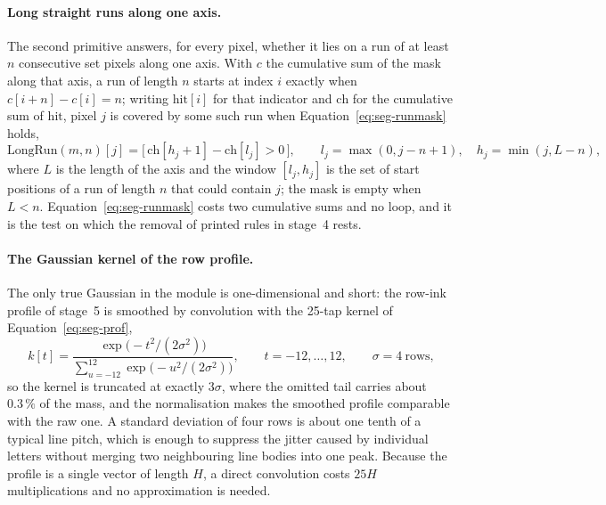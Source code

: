 \paragraph{Long straight runs along one axis.}
The second primitive answers, for every pixel, whether it lies on a run of at least $n$ consecutive set pixels along one axis.
With $c$ the cumulative sum of the mask along that axis, a run of length $n$ starts at index $i$ exactly when $c[i+n]-c[i]=n$; writing $\mathrm{hit}[i]$ for that indicator and $\mathrm{ch}$ for the cumulative sum of $\mathrm{hit}$, pixel $j$ is covered by some such run when Equation~\ref{eq:seg-runmask} holds,
\begin{equation}
\mathrm{LongRun}(m,n)[j]=\bigl[\,\mathrm{ch}[h_j+1]-\mathrm{ch}[l_j]>0\,\bigr],\qquad l_j=\max(0,j-n+1),\quad h_j=\min(j,L-n),
\label{eq:seg-runmask}
\end{equation}
where $L$ is the length of the axis and the window $[l_j,h_j]$ is the set of start positions of a run of length $n$ that could contain $j$; the mask is empty when $L<n$.
Equation~\ref{eq:seg-runmask} costs two cumulative sums and no loop, and it is the test on which the removal of printed rules in stage~4 rests.

\paragraph{The Gaussian kernel of the row profile.}
The only true Gaussian in the module is one-dimensional and short: the row-ink profile of stage~5 is smoothed by convolution with the 25-tap kernel of Equation~\ref{eq:seg-prof},
\begin{equation}
k[t]=\frac{\exp\bigl(-t^2/(2\sigma^2)\bigr)}{\sum_{u=-12}^{12}\exp\bigl(-u^2/(2\sigma^2)\bigr)},\qquad t=-12,\ldots,12,\qquad \sigma=4\ \text{rows},
\label{eq:seg-prof}
\end{equation}
so the kernel is truncated at exactly $3\sigma$, where the omitted tail carries about $0.3\,\%$ of the mass, and the normalisation makes the smoothed profile comparable with the raw one.
A standard deviation of four rows is about one tenth of a typical line pitch, which is enough to suppress the jitter caused by individual letters without merging two neighbouring line bodies into one peak.
Because the profile is a single vector of length $H$, a direct convolution costs $25H$ multiplications and no approximation is needed.

